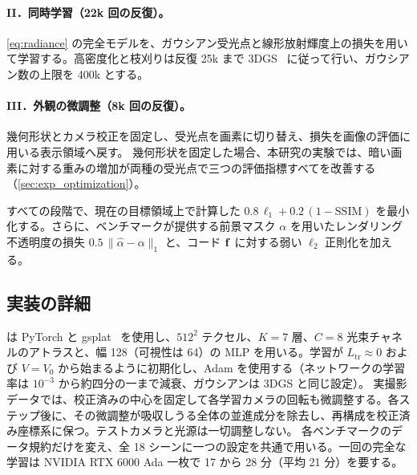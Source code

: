 \paragraph{II．同時学習（22k 回の反復）。}
\cref{eq:radiance} の完全モデルを、ガウシアン受光点と線形放射輝度上の損失を用いて学習する。高密度化と枝刈りは反復 25k まで 3DGS~\cite{kerbl20233d} に従って行い、ガウシアン数の上限を 400k とする。

\paragraph{III．外観の微調整（8k 回の反復）。}
幾何形状とカメラ校正を固定し、受光点を画素に切り替え、損失を画像の評価に用いる表示領域へ戻す。
幾何形状を固定した場合、本研究の実験では、暗い画素に対する重みの増加が両種の受光点で三つの評価指標すべてを改善する（\cref{sec:exp_optimization}）。

すべての段階で、現在の目標領域上で計算した $0.8\,\ell_1+0.2\,(1-\mathrm{SSIM})$ を最小化する。さらに、ベンチマークが提供する前景マスク $\alpha$ を用いたレンダリング不透明度の損失 $0.5\,\|\hat\alpha-\alpha\|_1$ と、コード $\mathbf{f}$ に対する弱い $\ell_2$ 正則化を加える。

\subsection{実装の詳細}
\label{sec:implementation}
\ours は PyTorch と gsplat~\cite{ye2025gsplat} を使用し、$512^2$ テクセル、$K=7$ 層、$C=8$ 光束チャネルのアトラスと、幅 128（可視性は 64）の MLP を用いる。学習が $L_{\mathrm{tr}}\approx 0$ および $V=V_0$ から始まるように初期化し、Adam を使用する（ネットワークの学習率は $10^{-3}$ から約四分の一まで減衰、ガウシアンは 3DGS と同じ設定）。
実撮影データでは、校正済みの中心を固定して各学習カメラの回転も微調整する。各ステップ後に、その微調整が吸収しうる全体の並進成分を除去し、再構成を校正済み座標系に保つ。テストカメラと光源は一切調整しない。
各ベンチマークのデータ規約だけを変え、全 18 シーンに一つの設定を共通で用いる。一回の完全な学習は NVIDIA RTX 6000 Ada 一枚で 17 から 28 分（平均 21 分）を要する。
